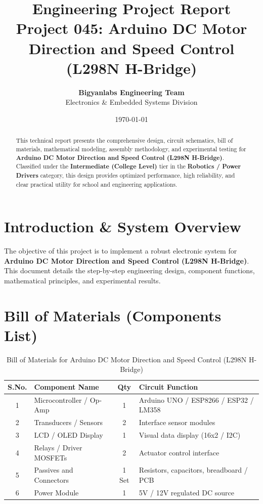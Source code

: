 \documentclass[11pt,a4paper]{article}
\title{\textbf{\Huge Engineering Project Report}\\[0.5em] \Large Project 045: Arduino DC Motor Direction and Speed Control (L298N H-Bridge)}
\author{\textbf{Bigyanlabs Engineering Team}\\ Electronics \& Embedded Systems Division}
\date{\today}
\begin{document}
\maketitle
\thispagestyle{empty}

\begin{abstract}
This technical report presents the comprehensive design, circuit schematics, bill of materials, mathematical modeling, assembly methodology, and experimental testing for \textbf{Arduino DC Motor Direction and Speed Control (L298N H-Bridge)}. Classified under the \textbf{Intermediate (College Level)} tier in the \textbf{Robotics / Power Drivers} category, this design provides optimized performance, high reliability, and clear practical utility for school and engineering applications.
\end{abstract}

\newpage
\tableofcontents
\newpage

\section{Introduction \& System Overview}
The objective of this project is to implement a robust electronic system for \textbf{Arduino DC Motor Direction and Speed Control (L298N H-Bridge)}. This document details the step-by-step engineering design, component functions, mathematical principles, and experimental results.

\section{Bill of Materials (Components List)}
\begin{table}[h!]
\centering
\caption{Bill of Materials for Arduino DC Motor Direction and Speed Control (L298N H-Bridge)}
\vspace{0.5em}
\begin{tabular}{clcp{7cm}}
\toprule
\textbf{S.No.} & \textbf{Component Name} & \textbf{Qty} & \textbf{Circuit Function} \\
\midrule
1 & Microcontroller / Op-Amp & 1 & Arduino UNO / ESP8266 / ESP32 / LM358 \\
2 & Transducers / Sensors & 2 & Interface sensor modules \\
3 & LCD / OLED Display & 1 & Visual data display (16x2 / I2C) \\
4 & Relays / Driver MOSFETs & 2 & Actuator control interface \\
5 & Passives and Connectors & 1 Set & Resistors, capacitors, breadboard / PCB \\
6 & Power Module & 1 & 5V / 12V regulated DC source \\
\bottomrule
\end{tabular}
\end{table}
\end{document}
